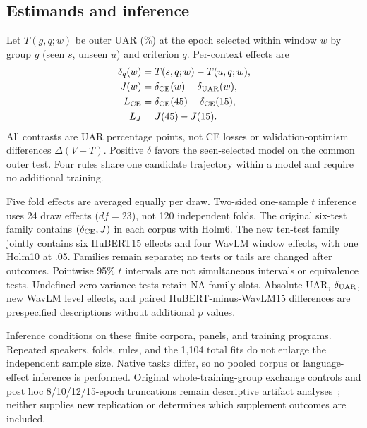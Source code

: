 \documentclass[letterpaper]{article}
\begin{document}
\subsection{Estimands and inference}
Let $T(g,q;w)$ be outer UAR (\%) at the epoch selected within window $w$ by group $g$ (seen $s$, unseen $u$) and criterion $q$. Per-context effects are
\begin{align}
\delta_q(w)&=T(s,q;w)-T(u,q;w),\\
J(w)&=\delta_{\rm CE}(w)-\delta_{\rm UAR}(w),\\
L_{\rm CE}&=\delta_{\rm CE}(45)-\delta_{\rm CE}(15),\\
L_J&=J(45)-J(15).
\end{align}
All contrasts are UAR percentage points, not CE losses or validation-optimism differences $\Delta(V-T)$. Positive $\delta$ favors the seen-selected model on the common outer test. Four rules share one candidate trajectory within a model and require no additional training.

Five fold effects are averaged equally per draw. Two-sided one-sample $t$ inference uses 24 draw effects ($df=23$), not 120 independent folds. The original six-test family contains $(\delta_{\rm CE},J)$ in each corpus with Holm6. The new ten-test family jointly contains six HuBERT15 effects and four WavLM window effects, with one Holm10 at .05. Families remain separate; no tests or tails are changed after outcomes. Pointwise 95\% $t$ intervals are not simultaneous intervals or equivalence tests. Undefined zero-variance tests retain NA family slots. Absolute UAR, $\delta_{\rm UAR}$, new WavLM level effects, and paired HuBERT-minus-WavLM15 differences are prespecified descriptions without additional $p$ values.

Inference conditions on these finite corpora, panels, and training programs. Repeated speakers, folds, rules, and the 1,104 total fits do not enlarge the independent sample size. Native tasks differ, so no pooled corpus or language-effect inference is performed. Original whole-training-group exchange controls and post hoc 8/10/12/15-epoch truncations remain descriptive artifact analyses~\cite{artifact}; neither supplies new replication or determines which supplement outcomes are included.
\end{document}
